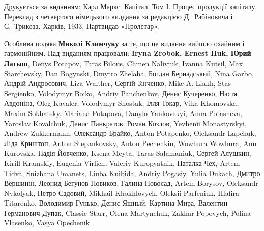 
Друкується за виданням: Карл Маркс. Капітал. Том І. Процес продукції капіталу. Переклад з четвертого німецького виддання за редакцією Д.~Рабіновича і С.~Трикоза. Харків, 1933, Партвидав «Пролетар».

\smallskip\noindent Особлива подяка \textbf{Миколі Климчуку} за те,
що це видання вийшло охайним і гармонійним. Над виданням працювали:
\textbf{Iryna Zrobok, Ernest Huk, Юрий Латыш},
Denys Po\-ta\-pov, Taras Bilous, Chmen Nalivnik, Ivanna Kutsil, Max Starchevsky, Dan Bogynski, Dmytro Zhelaha, Богдан Бернадський, Nina Garbo, Андрій Андросович, Liza Walther, Сергій Зінченко,
{\small
Mike A. Liakh, Stas Sergienko, Volodymyr Boiko, Andriy Panchenkov, Денис Кучеренко, Настя Авдоніна, Oleg Kavaler, Volodymyr Shostak, Ілля Токар, Vika Khomovska, Maxim Sokhatsky, Mariana Potapova, Danylo Yankovskyi, Anna Potasheva, Yaroslav Kovalchuk, Денис Панкратов, Роман Козлов, \textenglish{Yevhenii Mo\-nas\-tyr\-skyi}, Andrew Zukkermann, Олександр Брайко, Anton Potapenko, Oleksandr Lapchuk, Ліда Криштоп, Anton Stepankovsky, Anton Pechenkin, Wowhura Wowhura, Ann Kurovska, Надія Йовченко, Ksena Meyta, Taras Salamaniuk, Сергей Алушкин, Kirill Kramskiy, Eugenia Virlich, Valeriy Kuropyatnik, Наталка Чех, Artem Tidva, Snizhana Umanets, Liuba Kuibida, Andriy Pogasiy, Yulia Dukach, Дмитро Вершинін, Леонид Бегунов-Новиков, Галина Новосад, Artem Borysov, Oleksandr Nykolyak, Петро Садовий, Mikhail Khokhlovych, Oleksii Parfeniuk, Hlafira Titarenko, Володимир Гунько, Денис Яшный, Картина Мира, Валентин Германович Дупак, Classic Starr, Olena Martynchuk, Zakhar Popovych, Polina Vlasenko, Vasya Opechenik.}

\cleardoublepage
